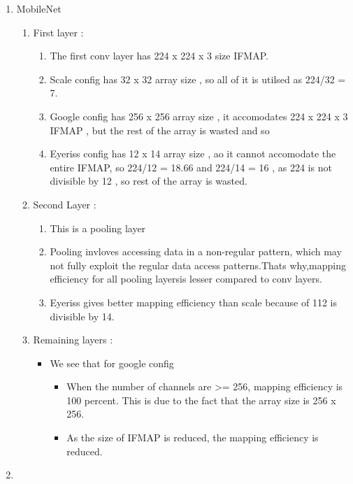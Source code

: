 \documentclass[12pt]{article}
\begin{document}
\begin{enumerate}
    \item MobileNet
    \begin{enumerate}
        \item First layer :
        \begin{enumerate}
            \item The first conv layer has 224 x 224 x 3 size IFMAP.
            \item Scale config has 32 x 32 array size , so all of it is utilsed  as 224/32 = 7.
            \item Google config has 256 x 256 array size , it accomodates 224 x 224 x 3 IFMAP , but the rest of the array is wasted and so
            \item Eyeriss config has 12 x 14 array size , ao it cannot accomodate the entire IFMAP, so 224/12 = 18.66 and 224/14 = 16 , as 224 is not divisible by 12 , so rest of the array is wasted.
        \end{enumerate}

        \item Second Layer :
        \begin{enumerate}
            \item This is a pooling layer
            \item Pooling invloves accessing data in a non-regular pattern, which may not fully exploit the regular data access patterns.Thats why,mapping efficiency for all pooling layersis lesser compared to conv layers.
            \item Eyeriss gives better mapping efficiency than scale because of 112 is divisible by 14.
        \end{enumerate}

        \item Remaining layers :
        \begin{itemize}
            \item We see that for google config 
            \begin{itemize}
                \item When the number of channels are >= 256, mapping efficiency is 100 percent. This is due to the fact that the array size is 256 x 256.
                \item As the size of IFMAP is reduced, the mapping efficiency is reduced.
            \end{itemize} 
        \end{itemize}
    \end{enumerate}

    \item 

\end{enumerate}
\end{document}
